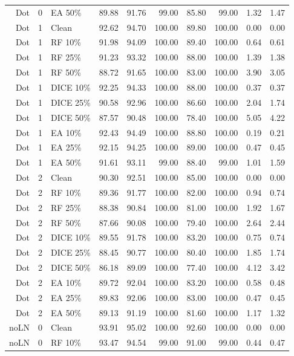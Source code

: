 {\begin{longtable}{rllrrrrrrr}
Dot & 0 & EA 50\% & 89.88 & 91.76 & 99.00 & 85.80 & 99.00 & 1.32 & 1.47 \\
Dot & 1 & Clean & 92.62 & 94.70 & 100.00 & 89.80 & 100.00 & 0.00 & 0.00 \\
Dot & 1 & RF 10\% & 91.98 & 94.09 & 100.00 & 89.40 & 100.00 & 0.64 & 0.61 \\
Dot & 1 & RF 25\% & 91.23 & 93.32 & 100.00 & 88.00 & 100.00 & 1.39 & 1.38 \\
Dot & 1 & RF 50\% & 88.72 & 91.65 & 100.00 & 83.00 & 100.00 & 3.90 & 3.05 \\
Dot & 1 & DICE 10\% & 92.25 & 94.33 & 100.00 & 88.00 & 100.00 & 0.37 & 0.37 \\
Dot & 1 & DICE 25\% & 90.58 & 92.96 & 100.00 & 86.60 & 100.00 & 2.04 & 1.74 \\
Dot & 1 & DICE 50\% & 87.57 & 90.48 & 100.00 & 78.40 & 100.00 & 5.05 & 4.22 \\
Dot & 1 & EA 10\% & 92.43 & 94.49 & 100.00 & 88.80 & 100.00 & 0.19 & 0.21 \\
Dot & 1 & EA 25\% & 92.15 & 94.25 & 100.00 & 89.00 & 100.00 & 0.47 & 0.45 \\
Dot & 1 & EA 50\% & 91.61 & 93.11 & 99.00 & 88.40 & 99.00 & 1.01 & 1.59 \\
Dot & 2 & Clean & 90.30 & 92.51 & 100.00 & 85.00 & 100.00 & 0.00 & 0.00 \\
Dot & 2 & RF 10\% & 89.36 & 91.77 & 100.00 & 82.00 & 100.00 & 0.94 & 0.74 \\
Dot & 2 & RF 25\% & 88.38 & 90.84 & 100.00 & 81.00 & 100.00 & 1.92 & 1.67 \\
Dot & 2 & RF 50\% & 87.66 & 90.08 & 100.00 & 79.40 & 100.00 & 2.64 & 2.44 \\
Dot & 2 & DICE 10\% & 89.55 & 91.78 & 100.00 & 83.20 & 100.00 & 0.75 & 0.74 \\
Dot & 2 & DICE 25\% & 88.45 & 90.77 & 100.00 & 80.40 & 100.00 & 1.85 & 1.74 \\
Dot & 2 & DICE 50\% & 86.18 & 89.09 & 100.00 & 77.40 & 100.00 & 4.12 & 3.42 \\
Dot & 2 & EA 10\% & 89.72 & 92.04 & 100.00 & 83.20 & 100.00 & 0.58 & 0.48 \\
Dot & 2 & EA 25\% & 89.83 & 92.06 & 100.00 & 83.00 & 100.00 & 0.47 & 0.45 \\
Dot & 2 & EA 50\% & 89.13 & 91.19 & 100.00 & 81.60 & 100.00 & 1.17 & 1.32 \\
noLN & 0 & Clean & 93.91 & 95.02 & 100.00 & 92.60 & 100.00 & 0.00 & 0.00 \\
noLN & 0 & RF 10\% & 93.47 & 94.54 & 99.00 & 91.00 & 99.00 & 0.44 & 0.47 \\

\end{longtable}}
